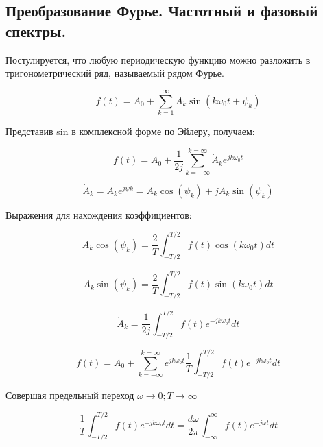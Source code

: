 \subsection{Преобразование Фурье. Частотный и фазовый спектры.}


Постулируется, что любую периодическую функцию можно разложить в тригонометрический ряд, называемый рядом Фурье.


\begin{equation}
f(t) = A_0 + \sum_{k=1}^{\infty} A_k \sin(k \omega_0 t + \psi_k)
\end{equation}

Представив sin в комплексной форме по Эйлеру, получаем:


\begin{equation}
f(t) = A_0 + \frac{1}{2j} \sum_{k = - \infty}^{k = \infty} \dot A_k e^{j k \omega_0 t} 
\end{equation}


\begin{equation}
\dot A_{k} = A_k e^{j \psi k} = A_k \cos(\psi_k) + j A_k \sin(\psi_k)
\end{equation}

Выражения для нахождения коэффициентов:

\begin{equation}
A_k \cos(\psi_k) = \frac{2}{T} \int_{-T/2}^{T/2}f(t)\cos(k \omega_0 t) dt
\end{equation}

\begin{equation}
A_k \sin(\psi_k) = \frac{2}{T} \int_{-T/2}^{T/2}f(t)\sin(k \omega_0 t) dt
\end{equation}

\begin{equation}
\dot A_k = \frac{1}{2j} \int_{-T/2}^{T/2}f(t) e^{-j k \omega_o t} dt
\end{equation}

\begin{equation}
f(t) = A_0 + \sum_{k = - \infty}^{k = \infty} e^{j k \omega_o t} \frac{1}{T} \int_{-T/2}^{T/2}f(t) e^{-j k \omega_o t} dt
\end{equation}



Совершая предельный переход $\omega \rightarrow 0; T \rightarrow \infty$


\begin{equation}
 \frac{1}{T} \int_{-T/2}^{T/2}f(t) e^{-j k \omega_o t} dt =  \frac{d \omega}{2 \pi} \int_{-\infty}^{\infty}f(t) e^{-j \omega t} dt
\end{equation}

